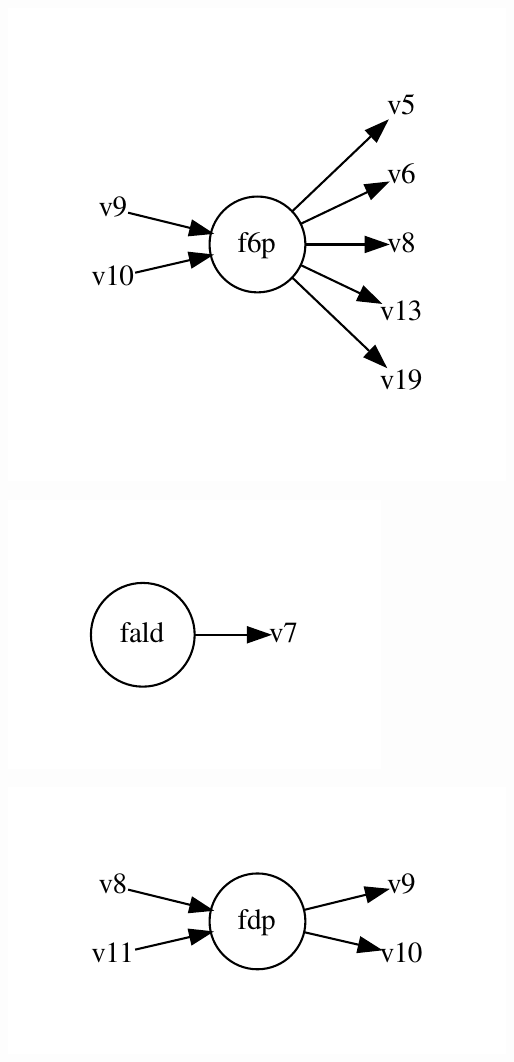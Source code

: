 \documentclass{scrartcl}
\begin{document}
\begin{minipage}{0.33\linewidth}
\includegraphics[max width=\linewidth]{metabolic_maps/f6p.pdf}
\end{minipage}
\begin{minipage}{0.33\linewidth}
\includegraphics[max width=\linewidth]{metabolic_maps/fald.pdf}
\end{minipage}
\begin{minipage}{0.33\linewidth}
\includegraphics[max width=\linewidth]{metabolic_maps/fdp.pdf}
\end{minipage}
\end{document}
